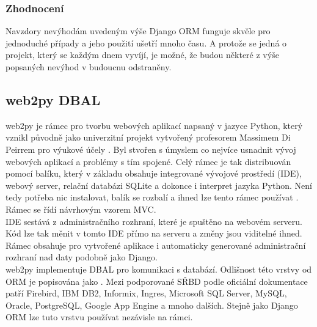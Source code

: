 \documentclass[ing,male,java,dept456]{diploma}						%
\begin{document}
\subsubsection{Zhodnocení}
Navzdory nevýhodám uvedeným výše Django ORM funguje skvěle pro jednoduché případy a jeho použití ušetří mnoho času. A protože se jedná o projekt, který se každým dnem vyvíjí, je možné, že budou některé z výše popsaných nevýhod v budoucnu odstraněny.

\subsection{web2py DBAL}

web2py je rámec pro tvorbu webových aplikací napsaný v jazyce Python, který vznikl původně jako univerzitní projekt vytvořený profesorem Massimem Di Peirrem pro výukové účely \cite{wikiw2p}. Byl stvořen s úmyslem co nejvíce usnadnit vývoj webových aplikací a problémy s tím spojené. Celý rámec je tak distribuován pomocí balíku, který v základu obsahuje integrované vývojové prostředí (IDE), webový server, relační databázi SQLite a dokonce i interpret jazyka Python. Není tedy potřeba nic instalovat, balík se rozbalí a ihned lze tento rámec používat \cite{web2py}. Rámec se řídí návrhovým vzorem MVC. \\
IDE sestává z administračního rozhraní, které je spuštěno na webovém serveru. Kód lze tak měnit v tomto IDE přímo na serveru a změny jsou viditelné ihned. Rámec obsahuje pro vytvořené aplikace i automaticky generované administrační rozhraní nad daty podobně jako Django. \\
web2py implementuje DBAL pro komunikaci s databází. Odlišnost této vrstvy od ORM je popisována jako  \cite{wikiw2p}. Mezi podporované SŘBD podle oficiální dokumentace patří Firebird, IBM DB2, Informix, Ingres, Microsoft SQL Server, MySQL, Oracle, PostgreSQL, Google App Engine a mnoho dalších. Stejně jako Django ORM lze tuto vrstvu používat nezávisle na rámci.
\end{document}
